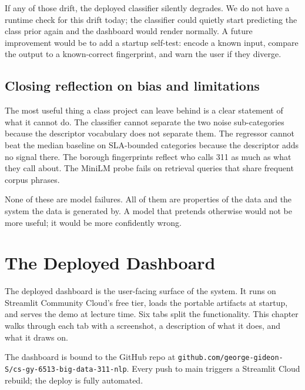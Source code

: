 \documentclass[11pt,letterpaper]{book}
\begin{document}
If any of those drift, the deployed classifier silently degrades. We do not have a runtime check for this drift today; the classifier could quietly start predicting the class prior again and the dashboard would render normally. A future improvement would be to add a startup self-test: encode a known input, compare the output to a known-correct fingerprint, and warn the user if they diverge.

\section{Closing reflection on bias and limitations}

The most useful thing a class project can leave behind is a clear statement of what it cannot do. The classifier cannot separate the two noise sub-categories because the descriptor vocabulary does not separate them. The regressor cannot beat the median baseline on SLA-bounded categories because the descriptor adds no signal there. The borough fingerprints reflect who calls 311 as much as what they call about. The MiniLM probe fails on retrieval queries that share frequent corpus phrases.

None of these are model failures. All of them are properties of the data and the system the data is generated by. A model that pretends otherwise would not be more useful; it would be more confidently wrong.


\chapter{The Deployed Dashboard}
\label{ch:dashboard}

The deployed dashboard is the user-facing surface of the system. It runs on Streamlit Community Cloud's free tier, loads the portable artifacts at startup, and serves the demo at lecture time. Six tabs split the functionality. This chapter walks through each tab with a screenshot, a description of what it does, and what it draws on.

The dashboard is bound to the GitHub repo at \texttt{github.com/george-gideon-S/cs-gy-6513-big-data-311-nlp}. Every push to main triggers a Streamlit Cloud rebuild; the deploy is fully automated.
\end{document}
